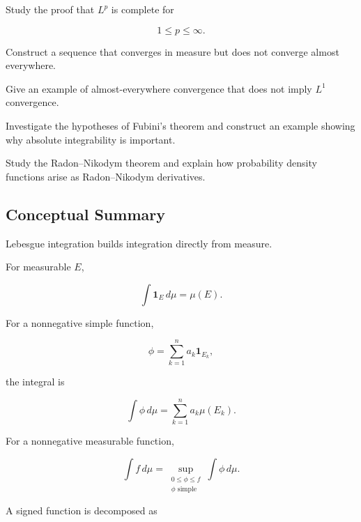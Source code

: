 \begin{exercise}[4]
Study the proof that \(L^p\) is complete for

\[
1\leq p\leq\infty.
\]
\end{exercise}

\begin{exercise}[4]
Construct a sequence that converges in measure but does not converge almost
everywhere.
\end{exercise}

\begin{exercise}[4]
Give an example of almost-everywhere convergence that does not imply
\(L^1\) convergence.
\end{exercise}

\begin{exercise}[4]
Investigate the hypotheses of Fubini's theorem and construct an example
showing why absolute integrability is important.
\end{exercise}

\begin{exercise}[4]
Study the Radon--Nikodym theorem and explain how probability density
functions arise as Radon--Nikodym derivatives.
\end{exercise}

\subsection{Conceptual Summary}
\label{subsec:lebesgue-integration-summary}

Lebesgue integration builds integration directly from measure.

For measurable \(E\),

\[
\boxed{
\int\mathbf{1}_E\,d\mu
=
\mu(E).
}
\]

For a nonnegative simple function,

\[
\phi
=
\sum_{k=1}^{n}
a_k\mathbf{1}_{E_k},
\]

the integral is

\[
\boxed{
\int\phi\,d\mu
=
\sum_{k=1}^{n}
a_k\mu(E_k).
}
\]

For a nonnegative measurable function,

\[
\boxed{
\int f\,d\mu
=
\sup_{\substack{0\leq\phi\leq f\\
\phi\text{ simple}}}
\int\phi\,d\mu.
}
\]

A signed function is decomposed as

